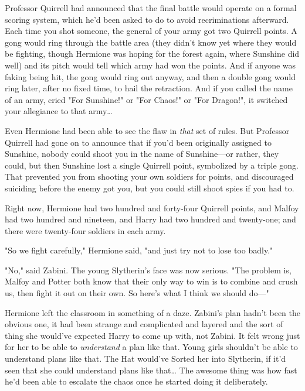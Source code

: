 Professor Quirrell had announced that the final battle would operate on a 
formal scoring system, which he'd been asked to do to avoid recriminations 
afterward. Each time you shot someone, the general of your army got two 
Quirrell points. A gong would ring through the battle area (they didn't know 
yet where they would be fighting, though Hermione was hoping for the forest 
again, where Sunshine did well) and its pitch would tell which army had won the 
points. And if anyone was faking being hit, the gong would ring out anyway, and 
then a double gong would ring later, after no fixed time, to hail the 
retraction. And if you called the name of an army, cried "For Sunshine!" or 
"For Chaos!" or "For Dragon!", it switched your allegiance to that army{\ldots}

Even Hermione had been able to see the flaw in \emph{that} set of rules. But 
Professor Quirrell had gone on to announce that if you'd been originally 
assigned to Sunshine, nobody could shoot you in the name of Sunshine---or 
rather, they could, but then Sunshine lost a single Quirrell point, symbolized 
by a triple gong. That prevented you from shooting your own soldiers for 
points, and discouraged suiciding before the enemy got you, but you could still 
shoot spies if you had to.

Right now, Hermione had two hundred and forty-four Quirrell points, and Malfoy 
had two hundred and nineteen, and Harry had two hundred and twenty-one; and 
there were twenty-four soldiers in each army.

"So we fight carefully," Hermione said, "and just try not to lose too badly."

"No," said Zabini. The young Slytherin's face was now serious. "The problem is, 
Malfoy and Potter both know that their only way to win is to combine and crush 
us, then fight it out on their own. So here's what I think we should do---"

Hermione left the classroom in something of a daze. Zabini's plan hadn't been 
the obvious one, it had been strange and complicated and layered and the sort 
of thing she would've expected Harry to come up with, not Zabini. It felt wrong 
just for her to be able to \emph{understand} a plan like that. Young girls 
shouldn't be able to understand plans like that. The Hat would've Sorted her 
into Slytherin, if it'd seen that she could understand plans like that{\ldots}
\sbreak
The awesome thing was how fast he'd been able to escalate the chaos once he 
started doing it deliberately.

